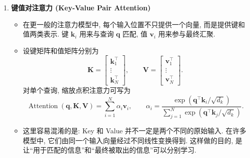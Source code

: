 \documentclass{../nndlcourse}
\begin{document}
\begin{enumerate}
\begin{itemize}
      \begin{equation*}
        s(\boldsymbol{x}_i,\boldsymbol{q}) = \frac{\boldsymbol{x}_i^{\top}\boldsymbol{q}}{\sqrt{d_k}}.
      \end{equation*}
      这里 $d_k$ 是键向量维度. 缩放的作用不是神秘技巧, 而是防止高维点积数值过大导致 softmax 过早饱和, 从而使梯度变小、训练变慢.
      \item \textbf{双线性模型 (bilinear attention)} 引入可学习矩阵:
      \begin{equation*}
        s(\boldsymbol{x}_i,\boldsymbol{q}) = \boldsymbol{x}_i^{\top}\boldsymbol{W}\boldsymbol{q}.
      \end{equation*}
      它比普通点积多了一层可学习的相似性度量, 但参数量也更大.
    \end{itemize}
  \item \textbf{键值对注意力 (Key-Value Pair Attention)}
    \begin{itemize}
      \item 在更一般的注意力模型中, 每个输入位置不只提供一个向量, 而是提供键和值两类表示. 键 $\boldsymbol{k}_i$ 用来与查询 $\boldsymbol{q}$ 匹配, 值 $\boldsymbol{v}_i$ 用来参与最终汇聚.
      \item 设键矩阵和值矩阵分别为
      \begin{equation*}
        \boldsymbol{K} =
        \begin{bmatrix}
          \boldsymbol{k}_1^{\top}\\
          \vdots\\
          \boldsymbol{k}_N^{\top}
        \end{bmatrix},
        \qquad
        \boldsymbol{V} =
        \begin{bmatrix}
          \boldsymbol{v}_1^{\top}\\
          \vdots\\
          \boldsymbol{v}_N^{\top}
        \end{bmatrix}.
      \end{equation*}
      对单个查询, 缩放点积注意力可写为
      \begin{equation*}
        \operatorname{Attention}(\boldsymbol{q},\boldsymbol{K},\boldsymbol{V})
        =
        \sum_{i=1}^{N}\alpha_i\boldsymbol{v}_i,
        \qquad
        \alpha_i =
        \frac{\exp(\boldsymbol{q}^{\top}\boldsymbol{k}_i/\sqrt{d_k})}
        {\sum_{j=1}^{N}\exp(\boldsymbol{q}^{\top}\boldsymbol{k}_j/\sqrt{d_k})}.
      \end{equation*}
      \item 这里容易混淆的是: Key 和 Value 并不一定是两个不同的原始输入. 在许多模型中, 它们由同一个输入向量经过不同线性变换得到. 这样做的目的, 是让“用于匹配的信息”和“最终被取出的信息”可以分别学习.

\end{itemize}
\end{enumerate}
\end{document}
